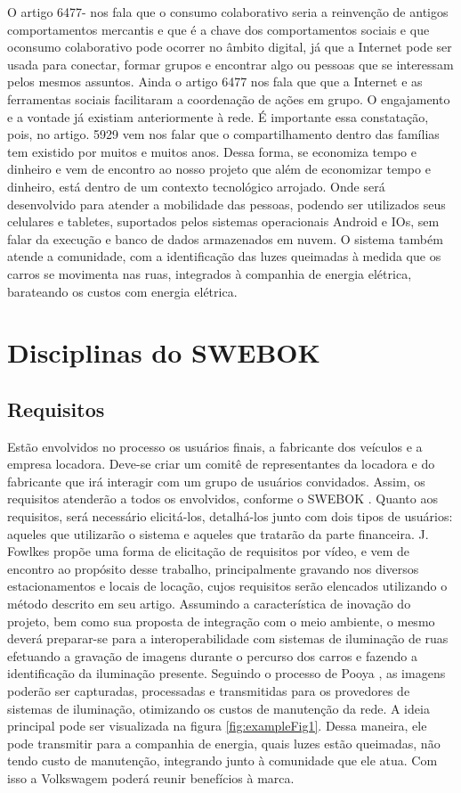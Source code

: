 \documentclass[12pt]{article}
\begin{document}
O artigo 6477- nos fala que o consumo colaborativo seria a reinvenção de antigos comportamentos mercantis e que é a chave dos comportamentos sociais e que oconsumo colaborativo pode ocorrer no âmbito digital, já que a Internet pode ser usada para conectar, formar grupos e encontrar algo ou pessoas que se interessam pelos mesmos assuntos. Ainda o artigo 6477 nos fala que que a Internet e as ferramentas sociais facilitaram a coordenação de ações em grupo. O engajamento e a vontade já existiam anteriormente à rede. É importante essa constatação, pois, no artigo. 5929 vem nos falar que o compartilhamento dentro das famílias tem existido por muitos e muitos anos. Dessa forma, se economiza tempo e dinheiro e vem de encontro ao nosso projeto que além de economizar tempo e dinheiro, está dentro de um contexto tecnológico arrojado. Onde será desenvolvido para atender a mobilidade das pessoas, podendo ser utilizados seus celulares e tabletes, suportados pelos sistemas operacionais Android e IOs, sem falar da execução e banco de dados armazenados em nuvem. O sistema também atende a comunidade, com a identificação das luzes queimadas à medida que os carros se movimenta nas ruas, integrados à companhia de energia elétrica, barateando os custos com energia elétrica.

\section{Disciplinas do SWEBOK}
\subsection{Requisitos}

Estão envolvidos no processo os usuários finais, a fabricante dos veículos e a empresa locadora. Deve-se criar um comitê de representantes da locadora e do fabricante que irá interagir com um grupo de usuários convidados. Assim, os requisitos atenderão a todos os envolvidos, conforme o SWEBOK \cite{Swebok}.
Quanto aos requisitos, será necessário elicitá-los, detalhá-los junto com dois tipos de usuários: aqueles que utilizarão o sistema e aqueles que tratarão da parte financeira. J. Fowlkes \cite{Fowlkes2000} propõe uma forma de elicitação de requisitos por vídeo, e vem de encontro ao propósito desse trabalho, principalmente gravando nos diversos estacionamentos e locais de locação, cujos requisitos serão elencados utilizando o método descrito em seu artigo.
Assumindo a característica de inovação do projeto, bem como sua proposta de integração com o meio ambiente, o mesmo deverá preparar-se para a interoperabilidade com sistemas de iluminação de ruas efetuando a gravação de imagens durante o percurso dos carros e fazendo a identificação da iluminação presente. Seguindo o processo de Pooya \cite{Pooya}, as imagens poderão ser capturadas, processadas e transmitidas para os provedores de sistemas de iluminação, otimizando os custos de manutenção da rede. A ideia principal pode ser visualizada na figura \ref{fig:exampleFig1}. Dessa maneira, ele pode transmitir para a companhia de energia, quais luzes estão queimadas, não tendo custo de manutenção, integrando junto à comunidade que ele atua. Com isso a  Volkswagem poderá reunir benefícios à marca.
\end{document}
